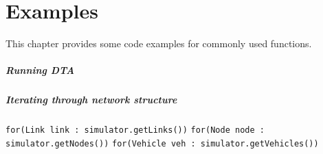 \chapter{Examples}
\label{sec:tutorials}

This chapter provides some code examples for commonly used functions.

\paragraph*{Running DTA}
\begin{algorithmic}[1]
\end{algorithmic}

\paragraph*{Iterating through network structure}
\begin{algorithmic}[1]
\State\texttt{for(Link link : simulator.getLinks())}
\State\texttt{for(Node node : simulator.getNodes())}
\State\texttt{for(Vehicle veh : simulator.getVehicles())}
\end{algorithmic}


